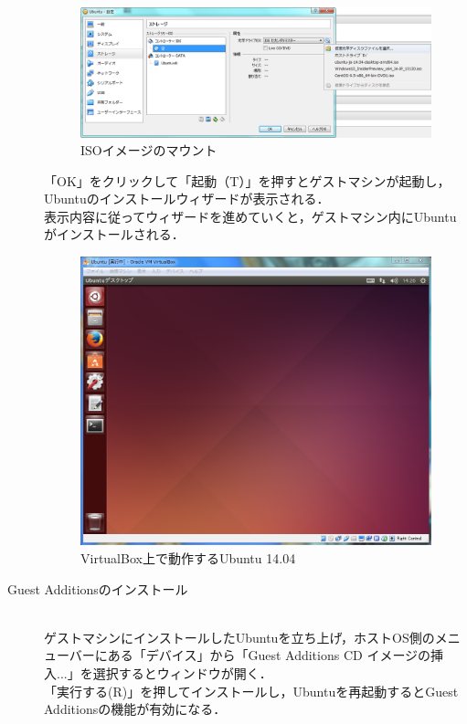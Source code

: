 \begin{description}
	\begin{figure}[H]
	\centering
	\includegraphics[width=15cm]{iso_set.png}
	\caption{ISOイメージのマウント}\label{isoset}
	\end{figure}
	
	「OK」をクリックして「起動（T）」を押すとゲストマシンが起動し，Ubuntuのインストールウィザードが表示される．\\
	表示内容に従ってウィザードを進めていくと，ゲストマシン内にUbuntuがインストールされる．

	\begin{figure}[H]
	\centering
	\includegraphics[width=15cm]{Ubuntu_on_VirtualBox.PNG}
	\caption{VirtualBox上で動作するUbuntu 14.04}\label{UbuntuVBox}
	\end{figure}

 \item[Guest Additionsのインストール]\mbox{}\\
	ゲストマシンにインストールしたUbuntuを立ち上げ，ホストOS側のメニューバーにある「デバイス」から「Guest Additions CD イメージの挿入...」を選択するとウィンドウが開く．\\
	「実行する(R)」を押してインストールし，Ubuntuを再起動するとGuest Additionsの機能が有効になる．
	

\end{description}

